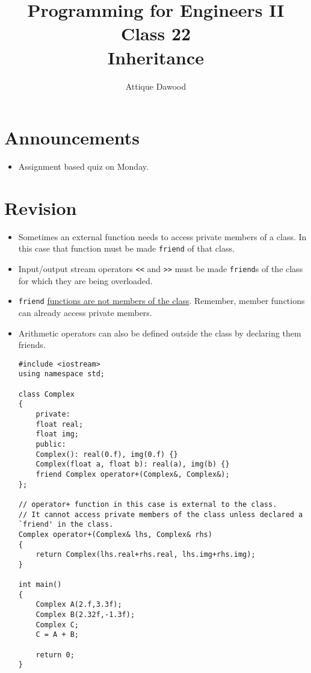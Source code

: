 \documentclass[12pt,a4paper]{article}
\title{\vspace{-2cm}Programming for Engineers II\\Class 22\\Inheritance}
\author{Attique Dawood}
\begin{document}
\maketitle
\section{Announcements}
\begin{itemize}
\item Assignment based quiz on Monday.
\end{itemize}
\section{Revision}
\begin{itemize}
\item Sometimes an external function needs to access private members of a class. In this case that function must be made \verb|friend| of that class.
\item Input/output stream operators \verb|<<| and \verb|>>| must be made \verb|friend|s of the class for which they are being overloaded.
\item \verb|friend| \underline{functions are not members of the class}. Remember, member functions can already access private members.
\item Arithmetic operators can also be defined outside the class by declaring them friends.
\begin{lstlisting}[caption={operator+ implemented as \texttt{friend}}]
#include <iostream>
using namespace std;

class Complex
{
	private:
	float real;
	float img;
	public:
	Complex(): real(0.f), img(0.f) {}
	Complex(float a, float b): real(a), img(b) {}
	friend Complex operator+(Complex&, Complex&);
};

// operator+ function in this case is external to the class.
// It cannot access private members of the class unless declared a `friend' in the class.
Complex operator+(Complex& lhs, Complex& rhs)
{
	return Complex(lhs.real+rhs.real, lhs.img+rhs.img);
}

int main()
{
	Complex A(2.f,3.3f);
	Complex B(2.32f,-1.3f);
	Complex C;
	C = A + B;

	return 0;
}
\end{lstlisting}
\end{itemize}
\end{document}
